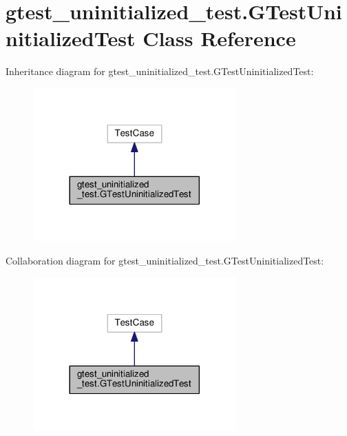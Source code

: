 \hypertarget{classgtest__uninitialized__test_1_1GTestUninitializedTest}{}\section{gtest\+\_\+uninitialized\+\_\+test.\+G\+Test\+Uninitialized\+Test Class Reference}
\label{classgtest__uninitialized__test_1_1GTestUninitializedTest}


Inheritance diagram for gtest\+\_\+uninitialized\+\_\+test.\+G\+Test\+Uninitialized\+Test\+:
\nopagebreak
\begin{figure}[H]
\begin{center}
\leavevmode
\includegraphics[width=221pt]{classgtest__uninitialized__test_1_1GTestUninitializedTest__inherit__graph}
\end{center}
\end{figure}


Collaboration diagram for gtest\+\_\+uninitialized\+\_\+test.\+G\+Test\+Uninitialized\+Test\+:
\nopagebreak
\begin{figure}[H]
\begin{center}
\leavevmode
\includegraphics[width=221pt]{classgtest__uninitialized__test_1_1GTestUninitializedTest__coll__graph}
\end{center}
\end{figure}
